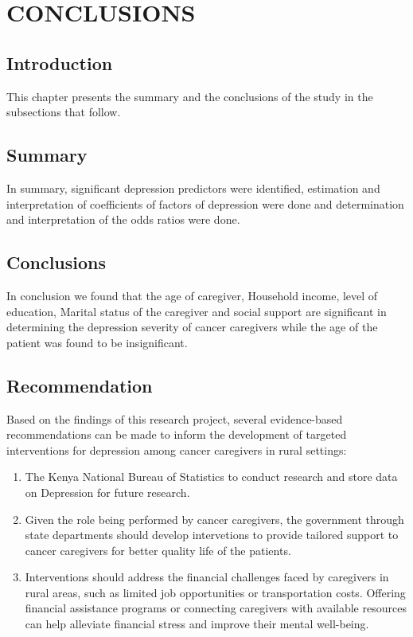 \documentclass[12pt]{article}\usepackage[]{graphicx}\usepackage[]{xcolor}
\numberwithin{equation}{section}
\numberwithin{figure}{section}
\begin{document}
\section*{CONCLUSIONS}
\setcounter{section}{5}
\setcounter{subsection}{0}
\subsection{Introduction}
This chapter presents the summary and the conclusions of the study in the subsections
that follow.
	\subsection{Summary}
In summary, significant depression predictors were identified, estimation and interpretation of coefficients of factors of depression were done and determination and interpretation of the odds ratios were done. 
\subsection{Conclusions}

In conclusion we found that the age of caregiver, Household income, level of education, Marital status of the caregiver and social support are significant in determining
the depression severity of cancer caregivers while the age of the patient was found
to be insignificant.
\newpage
\subsection{Recommendation}
Based on the findings of this research project, several evidence-based recommendations can be made to inform the development of targeted interventions for depression among cancer caregivers in rural settings:
\begin{enumerate}
	\item The Kenya National Bureau  of Statistics to conduct research and store data on Depression for future research.
	
	\item Given the role being performed by cancer caregivers, the government through state departments should develop intervetions to provide tailored support to cancer caregivers for better quality life of the patients. 
	
	\item Interventions should address the financial challenges faced by caregivers in rural areas, such as limited job opportunities or transportation costs. Offering financial assistance programs or connecting caregivers with available resources can help alleviate financial stress and improve their mental well-being.
\end{enumerate}
\newpage
\end{document}
